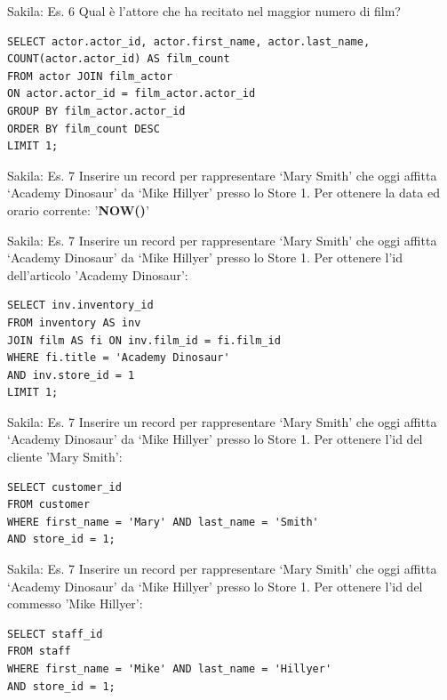 %
\begin{frame}[fragile]{Sakila: Es. 6}
Qual \`e l'attore che ha recitato nel maggior numero di film?
\pause
\begin{lstlisting}
SELECT actor.actor_id, actor.first_name, actor.last_name,
COUNT(actor.actor_id) AS film_count
FROM actor JOIN film_actor
ON actor.actor_id = film_actor.actor_id
GROUP BY film_actor.actor_id
ORDER BY film_count DESC
LIMIT 1;
\end{lstlisting}
\end{frame}
%
\begin{frame}[fragile]{Sakila: Es. 7}
Inserire un record per rappresentare `Mary Smith' che oggi affitta `Academy Dinosaur' da `Mike Hillyer' presso lo Store 1.
\pause
\newline
\newline
Per ottenere la data ed orario corrente: '\textbf{NOW()}'
\end{frame}

\begin{frame}[fragile]{Sakila: Es. 7}
Inserire un record per rappresentare `Mary Smith' che oggi affitta `Academy Dinosaur' da `Mike Hillyer' presso lo Store 1.
\newline
\newline
Per ottenere l'id dell'articolo 'Academy Dinosaur':
\begin{lstlisting}
SELECT inv.inventory_id
FROM inventory AS inv
JOIN film AS fi ON inv.film_id = fi.film_id
WHERE fi.title = 'Academy Dinosaur'
AND inv.store_id = 1
LIMIT 1;
\end{lstlisting}
\end{frame}

\begin{frame}[fragile]{Sakila: Es. 7}
Inserire un record per rappresentare `Mary Smith' che oggi affitta `Academy Dinosaur' da `Mike Hillyer' presso lo Store 1.
\newline
\newline
Per ottenere l'id del cliente 'Mary Smith':
\begin{lstlisting}
SELECT customer_id
FROM customer
WHERE first_name = 'Mary' AND last_name = 'Smith'
AND store_id = 1;
\end{lstlisting}
\end{frame}

\begin{frame}[fragile]{Sakila: Es. 7}
Inserire un record per rappresentare `Mary Smith' che oggi affitta `Academy Dinosaur' da `Mike Hillyer' presso lo Store 1.
\newline
\newline
Per ottenere l'id del commesso 'Mike Hillyer':
\begin{lstlisting}
SELECT staff_id
FROM staff
WHERE first_name = 'Mike' AND last_name = 'Hillyer'
AND store_id = 1;
\end{lstlisting}
\end{frame}

